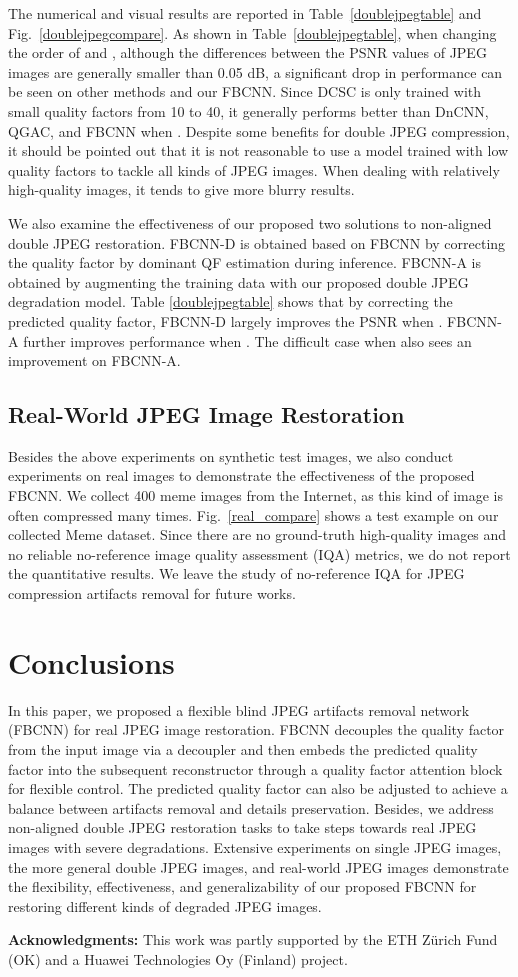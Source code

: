 \documentclass[10pt,twocolumn,letterpaper]{article}
\begin{document}
The numerical and visual results are reported in Table~\ref{doublejpegtable} and Fig.~\ref{doublejpegcompare}. As shown in Table~\ref{doublejpegtable}, when changing the order of  and , although the differences between the PSNR values of JPEG images are generally smaller than 0.05 dB, a significant drop in performance can be seen on other methods and our FBCNN. Since DCSC is only trained with small quality factors from 10 to 40, it generally performs better than DnCNN, QGAC, and FBCNN when   . Despite some benefits for double JPEG compression, it should be pointed out that it is not reasonable to use a model trained with low quality factors to tackle all kinds of JPEG images. When dealing with relatively high-quality images, it tends to give more blurry results.

We also examine the effectiveness of our proposed two solutions to non-aligned double JPEG restoration. FBCNN-D is obtained based on FBCNN by correcting the quality factor by dominant QF estimation during inference. FBCNN-A is obtained by augmenting the training data with our proposed double JPEG degradation model. Table \ref{doublejpegtable} shows that by correcting the predicted quality factor, FBCNN-D largely improves the PSNR when   . FBCNN-A further improves performance when   . The difficult case when    also sees an improvement on FBCNN-A.

\subsection{Real-World JPEG Image Restoration}

Besides the above experiments on synthetic test images, we also conduct experiments on real images to demonstrate the effectiveness of the proposed FBCNN. We collect 400 meme images from the Internet, as this kind of image is often compressed many times. Fig.~\ref{real_compare} shows a test example on our collected Meme dataset. 
Since there are no ground-truth high-quality images and no reliable no-reference image quality assessment (IQA) metrics, we do not report the quantitative results. We leave the study of no-reference IQA for JPEG compression artifacts removal for future works.

\section{Conclusions}
In this paper, we proposed a flexible blind JPEG artifacts removal network (FBCNN) for real JPEG image restoration. FBCNN decouples the quality factor from the input image via a decoupler and then embeds the predicted quality factor into the subsequent reconstructor through a quality factor attention block for flexible control. The predicted quality factor can also be adjusted to achieve a balance between artifacts removal and details preservation. Besides, we address non-aligned double JPEG restoration tasks to take steps towards real JPEG images with severe degradations. Extensive experiments on single JPEG images, the more general double JPEG images, and real-world JPEG images demonstrate the flexibility, effectiveness, and generalizability of our proposed FBCNN for restoring different kinds of degraded JPEG images.

\noindent\textbf{Acknowledgments:}
This work was partly supported by the ETH Z\"urich Fund (OK) and a Huawei Technologies Oy (Finland) project.



\clearpage

{\small


}
\end{document}
